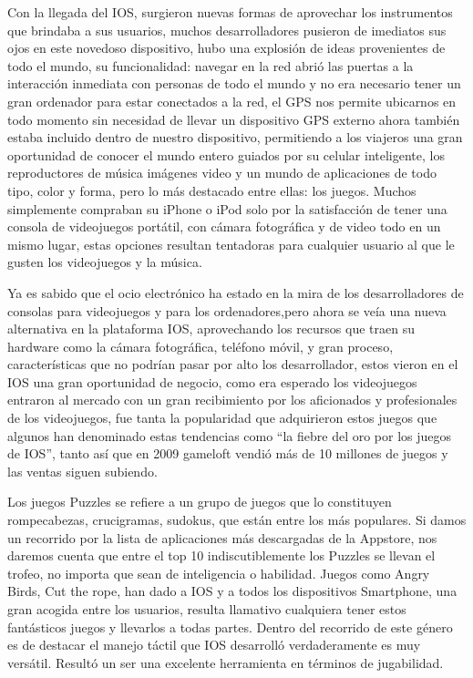 Con la llegada del IOS, surgieron nuevas formas de aprovechar
los instrumentos que brindaba a sus usuarios, muchos
desarrolladores pusieron de imediatos sus ojos en este novedoso
dispositivo, hubo una explosión de ideas provenientes de todo el
mundo, su funcionalidad: navegar en la red abrió las puertas a
la interacción inmediata con personas de todo el mundo y no era
necesario tener un gran ordenador para estar conectados a la
red, el GPS nos permite ubicarnos en todo momento sin
necesidad de llevar un dispositivo GPS externo ahora también
estaba incluido dentro de nuestro dispositivo, permitiendo a los
viajeros una gran oportunidad de conocer el mundo entero
guiados por su celular inteligente, los reproductores de música
imágenes video y un mundo de aplicaciones de todo tipo, color y
forma, pero lo más destacado entre ellas: los juegos. Muchos
simplemente compraban su iPhone o iPod solo por la
satisfacción de tener una consola de videojuegos portátil, con
cámara fotográfica y de video todo en un mismo lugar, estas
opciones resultan tentadoras para cualquier usuario al que le
gusten los videojuegos y la música.

Ya es sabido que el ocio electrónico ha estado en la mira de los
desarrolladores de consolas para videojuegos y para los
ordenadores,pero ahora se veía una nueva alternativa en la
plataforma IOS, aprovechando los recursos que traen su
hardware como la cámara fotográfica, teléfono móvil, y gran
proceso, características que no podrían pasar por alto los
desarrollador, estos vieron en el IOS una gran oportunidad de
negocio, como era esperado los videojuegos entraron al mercado
con un gran recibimiento por los aficionados y profesionales de
los videojuegos, fue tanta la popularidad que adquirieron estos
juegos que algunos han denominado estas tendencias como “la
fiebre del oro por los juegos de IOS”, tanto así que en 2009
gameloft vendió más de 10 millones de juegos y las ventas
siguen subiendo.

Los juegos Puzzles se refiere a un grupo de juegos que lo
constituyen rompecabezas, crucigramas, sudokus, que están
entre los más populares. Si damos un recorrido por la lista de
aplicaciones más descargadas de la Appstore, nos daremos
cuenta que entre el top 10 indiscutiblemente los Puzzles se
llevan el trofeo, no importa que sean de inteligencia o habilidad.
Juegos como Angry Birds, Cut the rope, han dado a IOS y a
todos los dispositivos Smartphone, una gran acogida entre los
usuarios, resulta llamativo cualquiera tener estos fantásticos
juegos y llevarlos a todas partes. Dentro del recorrido de este
género es de destacar el manejo táctil que IOS desarrolló
verdaderamente es muy versátil. Resultó un ser una excelente
herramienta en términos de jugabilidad.

